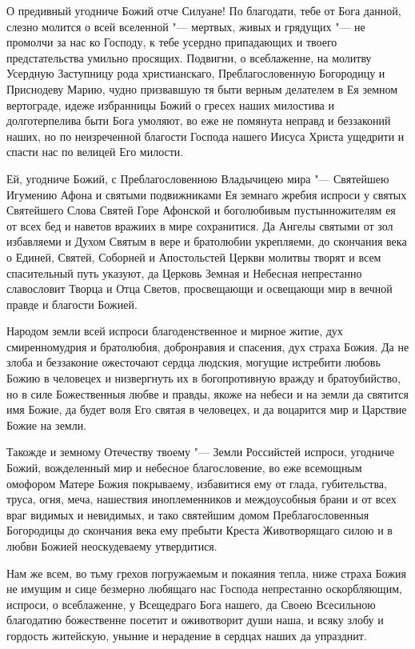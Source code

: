О предивный угодниче Божий отче Силуане! По благодати, тебе от Бога данной, слезно молится о всей вселенной "--- мертвых, живых и грядущих "--- не промолчи за нас ко Господу, к тебе усердно припадающих и твоего предстательства умильно просящих. Подвигни, о всеблаженне, на молитву Усердную Заступницу рода христианскаго, Преблагословенную Богородицу и Приснодеву Марию, чудно призвавшую тя быти верным делателем в Ея земном вертограде, идеже избранницы Божий о гресех наших милостива и долготерпелива быти Бога умоляют, во еже не помянута неправд и беззаконий наших, но по неизреченной благости Господа нашего Иисуса Христа ущедрити и спасти нас по велицей Его милости. 


Ей, угодниче Божий, с Преблагословенною Владычицею мира "--- Святейшею Игумению Афона и святыми подвижниками Ея земнаго жребия испроси у святых Святейшего Слова Святей Горе Афонской и боголюбивым пустынножителям ея от всех бед и наветов вражиих в мире сохранитися. Да Ангелы святыми от зол избавляеми и Духом Святым в вере и братолюбии укрепляеми, до скончания века о Единей, Святей, Соборней и Апостольстей Церкви молитвы творят и всем спасительный путь указуют, да Церковь Земная и Небесная непрестанно славословит Творца и Отца Светов, просвещающи и освещающи мир в вечной правде и благости Божией. 


Народом земли всей испроси благоденственное и мирное житие, дух смиренномудрия и братолюбия, добронравия и спасения, дух страха Божия. Да не злоба и беззаконие ожесточают сердца людския, могущие истребити любовь Божию в человецех и низвергнуть их в богопротивную вражду и братоубийство, но в силе Божественныя любве и правды, якоже на небеси и на земли да святится имя Божие, да будет воля Его святая в человецех, и да воцарится мир и Царствие Божие на земли. 


Такожде и земному Отечеству твоему "--- Земли Российстей испроси, угодниче Божий, вожделенный мир и небесное благословение, во еже всемощным омофором Матере Божия покрываему, избавитися ему от глада, губительства, труса, огня, меча, нашествия иноплеменников и междоусобныя брани и от всех враг видимых и невидимых, и тако святейшим домом Преблагословенныя Богородицы до скончания века ему пребыти Креста Животворящаго силою и в любви Божией неоскудеваему утвердитися.


Нам же всем, во тьму грехов погружаемым и покаяния тепла, ниже страха Божия не имущим и сице безмерно любящаго нас Господа непрестанно оскорбляющим, испроси, о всеблаженне, у Всещедраго Бога нашего, да Своею Всесильною благодатию божественне посетит и оживотворит души наша, и всяку злобу и гордость житейскую, уныние и нерадение в сердцах наших да упразднит. 



